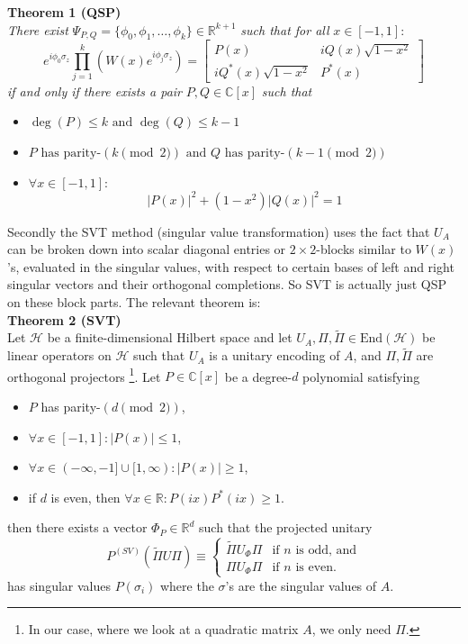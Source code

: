 \documentclass{article}
\begin{document}
\noindent  \textbf{Theorem 1 (QSP)} \\
\textit{There exist} $\Psi_{P,Q} = \{\phi_0, \phi_1, \dots, \phi_k\} \in \mathbb{R}^{k+1}$ \textit{ such that for all } $x \in [-1, 1]:$
$$
e^{i\phi_0 \sigma_z} \prod_{j=1}^{k} (W(x)e^{i\phi_j \sigma_z}) = 
\begin{bmatrix}
P(x) & iQ(x)\sqrt{1-x^2} \\
iQ^*(x)\sqrt{1-x^2} & P^*(x)
\end{bmatrix}
$$
\noindent \textit{if and only if  there exists a pair} $P, Q \in \mathbb{C}[x]$ \textit{ such that}
\begin{itemize}
    \item $\deg(P) \leq k \text{ and } \deg(Q) \leq k - 1$
    \item $P \text{ has parity-}(k \pmod 2) \text{ and } Q \text{ has parity-}(k - 1 \pmod 2)$
    \item $\forall x \in [-1, 1]:$ 
\begin{equation}    
    |P(x)|^2 + (1 - x^2)|Q(x)|^2 = 1 \label{eq:qsp_condition}
\end{equation}
\end{itemize}

\noindent Secondly the  SVT method (singular value transformation) uses the fact that $U_A$ can be broken down into scalar diagonal entries or $2\times 2$-blocks similar to $W(x)$'s, evaluated in the singular values, with respect to certain bases of left and right singular vectors and their orthogonal completions. So SVT is actually just QSP on these block parts. The relevant theorem is:\\

\noindent  \textbf{Theorem 2 (SVT)} \\
Let $\mathcal{H}$ be a finite-dimensional Hilbert space and let $U_A, \Pi, \tilde{\Pi} \in \text{End}(\mathcal{H})$ be linear operators on $\mathcal{H}$ such that $U_A$ is a unitary encoding of $A$, and $\Pi, \tilde{\Pi}$ are orthogonal projectors \footnote{In our case, where we look at a quadratic matrix $A$, we only need $\Pi$.}. 
Let $P \in \mathbb{C}[x]$ be a degree-$d$ polynomial satisfying
\begin{itemize}
    \item $P$ has parity-$(d \pmod 2)$,
    \item $\forall x \in [-1, 1]: |P(x)| \leq 1$,
    \item $\forall x \in (-\infty, -1] \cup [1, \infty): |P(x)| \geq 1$,
    \item if $d$ is even, then $\forall x \in \mathbb{R}: P(ix)P^*(ix) \geq 1$.
\end{itemize} 
then there exists a vector $\Phi_P \in \mathbb{R}^d$ such that the projected unitary
\begin{equation*}
P^{(SV)}(\tilde{\Pi}U\Pi) \equiv \begin{cases} \tilde{\Pi}U_\Phi\Pi & \text{if } n \text{ is odd, and} \\ \Pi U_\Phi\Pi & \text{if } n \text{ is even.} \end{cases}
\end{equation*}
has singular values $P(\sigma_i)$ where the $\sigma$'s are the singular values of $A$.\\
\end{document}
